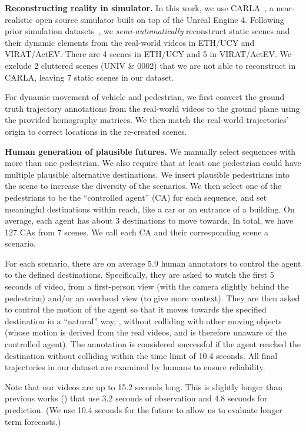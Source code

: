 \documentclass[10pt,twocolumn,letterpaper]{article}
\begin{document}
\noindent\textbf{Reconstructing reality in simulator.}
In this work, we use CARLA~\cite{dosovitskiy2017carla}, a near-realistic open source simulator built on top of the Unreal Engine 4. 
Following prior simulation datasets~\cite{gaidon2016virtual,ros2016synthia}, we \textit{semi-automatically} reconstruct static scenes and their dynamic elements from the real-world videos in ETH/UCY and VIRAT/ActEV.
There are 4 scenes in ETH/UCY and 5 in VIRAT/ActEV. We exclude 2 cluttered scenes (UNIV \& 0002)
that we are not able to reconstruct in CARLA, leaving 7 static scenes in our dataset.

For dynamic movement of vehicle and pedestrian, we first convert the ground truth trajectory annotations from the real-world videos to the ground plane using the provided homography matrices.
We then match the real-world trajectories' origin to correct locations in the re-created scenes. 





\noindent\textbf{Human generation of plausible futures.}
We manually select sequences with more than one pedestrian.
We also require that
at least one pedestrian could have multiple plausible alternative destinations.
We insert plausible pedestrians into the scene to increase the diversity of the scenarios.
We then select one of the pedestrians to be the ``controlled agent'' (CA) for each sequence,  and set meaningful destinations within reach, like a car or an entrance of a building.
On average, each agent has about 3 destinations to move towards.
In total, 
we have 127 CAs from 7 scenes. We call each CA and their corresponding scene a scenario.


For each scenario,  
there are on average 5.9 human annotators to control the agent to the defined destinations. 
Specifically, they are asked to watch the first 5 seconds of video, from a first-person view (with the camera slightly behind the pedestrian) and/or an overhead view (to give more context). They are then asked to control the motion of the agent so that it moves towards the specified destination in a ``natural'' way, \eg, without colliding with other moving objects (whose motion is derived from the real videos, and is therefore unaware of the controlled agent).
The annotation is considered successful if the agent reached the destination without colliding within the time limit of 10.4 seconds. 
All final trajectories in our dataset are examined by humans to ensure reliability.

Note that our videos
are up to 15.2 seconds long.
This is slightly longer than previous works
(\eg \cite{alahi2016social,gupta2018social,liang2019peeking,sadeghian2018sophie,li2019way,zhang2019sr,zhao2019multi})
that use
3.2 seconds of observation and 
4.8 seconds for prediction.
(We use 10.4 seconds for the future
 to allow us to evaluate longer term forecasts.)
\end{document}
